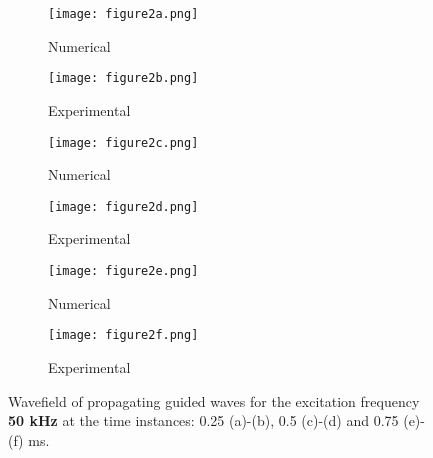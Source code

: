 \documentclass[runningheads]{llncs}
\begin{document}
\begin{figure} [h!]
	\centering
	\begin{subfigure}[b]{0.49\textwidth}
		\centering
		\texttt{[image: figure2a.png]}
		\caption{Numerical}
		\label{fig:wavefield50a}
	\end{subfigure}
	\begin{subfigure}[b]{0.49\textwidth}
		\centering
		\texttt{[image: figure2b.png]}
		\caption{Experimental}
		\label{fig:wavefield50b}
	\end{subfigure}
	\begin{subfigure}[b]{0.49\textwidth}
		\centering
		\texttt{[image: figure2c.png]}
		\caption{Numerical}
		\label{fig:wavefield50c}
	\end{subfigure}
	\begin{subfigure}[b]{0.49\textwidth}
		\centering
		\texttt{[image: figure2d.png]}
		\caption{Experimental}
		\label{fig:wavefield50d}
	\end{subfigure}
	\begin{subfigure}[b]{0.49\textwidth}
		\centering
		\texttt{[image: figure2e.png]}
		\caption{Numerical}
		\label{fig:wavefield50e}
	\end{subfigure}
	\begin{subfigure}[b]{0.49\textwidth}
		\centering
		\texttt{[image: figure2f.png]}
		\caption{Experimental}
		\label{fig:wavefield50f}
	\end{subfigure}
	\caption{Wavefield of propagating guided waves for the excitation frequency \textbf{50 kHz} at the time instances:  0.25 (a)-(b), 0.5 (c)-(d) and 0.75 (e)-(f) ms. }
	\label{fig:wavefield50}
\end{figure}
\end{document}
